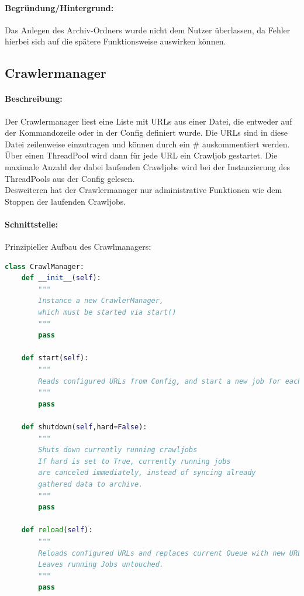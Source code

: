 \paragraph{Begründung/Hintergrund:}
\label{par:begr_ndung_}
Das Anlegen des Archiv-Ordners wurde nicht dem Nutzer überlassen, da
Fehler hierbei sich auf die spätere Funktionsweise auswirken können.


\subsection{Crawlermanager}
\label{sub:crawlermanager}
\paragraph{Beschreibung:}
\label{par:beschreibung_}
Der Crawlermanager liest eine Liste mit URLs aus einer Datei, die entweder auf der Kommandozeile oder in
der Config definiert wurde. Die URLs sind in diese Datei zeilenweise einzutragen und können durch ein \# auskommentiert werden.
Über einen ThreadPool wird dann für jede URL ein Crawljob gestartet. Die maximale Anzahl der dabei laufenden Crawljobs wird bei
der Instanzierung des ThreadPools aus der Config gelesen.
\\
Desweiteren hat der Crawlermanager nur administrative Funktionen wie dem Stoppen der laufenden Crawljobs.
\paragraph{Schnittstelle:}
\label{par:schnittstelle_}
Prinzipieller Aufbau des Crawlmanagers:
\begin{lstlisting}[language=python]
class CrawlManager:
    def __init__(self):
        """
        Instance a new CrawlerManager,
        which must be started via start()
        """
        pass

    def start(self):
        """
        Reads configured URLs from Config, and start a new job for each
        """
        pass

    def shutdown(self,hard=False): 
        """
        Shuts down currently running crawljobs
        If hard is set to True, currently running jobs
        are canceled immediately, instead of syncing already
        gathered data to archive.
        """
        pass

    def reload(self):
        """
        Reloads configured URLs and replaces current Queue with new URLs.
        Leaves running Jobs untouched.
        """
        pass

\end{lstlisting}

